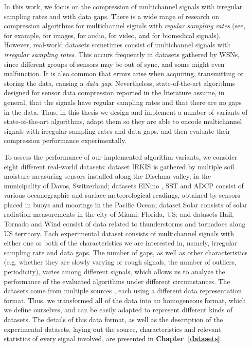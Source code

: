 In this work, we focus on the compression of multichannel signals with irregular sampling rates and with data gaps. There is a wide range of research on compression algorithms for multichannel signals with \textit{regular sampling rates} (see, for example, \cite{ImageOne, ImageTwo} for images, \cite{AudioOne, AudioTwo} for audio, \cite{VideoOne, VideoTwo} for video, and \cite{MedicalOne, MedicalTwo} for biomedical signals). However, real-world datasets sometimes consist of multichannel signals with \textit{irregular sampling rates}. This occurs frequently in datasets gathered by WSNs\footSampling, since different groups of sensors may be out of sync, and some might even malfunction. It is also common that errors arise when acquiring, transmitting or storing the data, causing a \textit{data gap}. Nevertheless, state-of-the-art algorithms designed for sensor data compression reported in the literature \cite{AnEva2013, Signal2016} assume, in general, that the signals have regular sampling rates and that there are no gaps in the data. Thus, in this thesis we design and implement a number of variants of state-of-the-art algorithms, adapt them so they are able to encode multichannel signals with irregular sampling rates and data gaps, and then evaluate their compression performance experimentally.


To assess the performance of our implemented algorithm variants, we consider eight different real-world datasets: dataset IRKIS \cite{dataset:irkis} is gathered by multiple soil moisture measuring sensors installed along the Dischma valley, in the municipality of Davos, Switzerland; datasets ElNino \cite{dataset:elnino}, SST and ADCP \cite{dataset:sst1} consist of various oceanographic and surface meteorological readings, obtained by sensors placed in buoys and moorings in the Pacific Ocean; dataset Solar \cite{dataset:solar} consists of solar radiation measurements in the city of Miami, Florida, US; and datasets Hail, Tornado and Wind \cite{dataset:spc} consist of data related to thunderstorms and tornadoes along US territory. Each experimental dataset consists of multichannel signals with either one or both of the characteristics we are interested in, namely, irregular sampling rate and data gaps. The number of gaps, as well as other characteristics (e.g. whether they are slowly varying or rough signals, the number of outliers, periodicity), varies among different signals, which allows us to analyze the performance of the evaluated algorithms under different circumstances. The datasets come from multiple sources \dataCite, each using a different data representation format. Thus, we transformed all of the data into an homogeneous format, which we define ourselves, and can be easily adapted to represent different kinds of datasets. The details of this data format, as well as the description of the experimental datasets, laying out the source, characteristics and relevant statistics of every signal involved, are presented in \textbf{Chapter~\ref{datasets}}.



